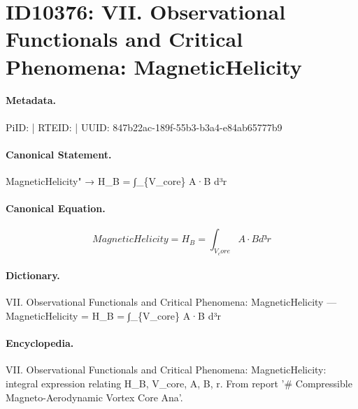 \section*{ID10376: VII. Observational Functionals and Critical Phenomena: MagneticHelicity}
\paragraph{Metadata.}
PiID:  | RTEID:  | UUID: 847b22ac-189f-55b3-b3a4-e84ab65777b9

\paragraph{Canonical Statement.}
MagneticHelicity" → H\_B = ∫\_\{V\_core\} A·B d³r

\paragraph{Canonical Equation.}
\[
MagneticHelicity = H_B = ∫_{V_core} A·B d³r
\]

\paragraph{Dictionary.}
VII. Observational Functionals and Critical Phenomena: MagneticHelicity — MagneticHelicity = H\_B = ∫\_\{V\_core\} A·B d³r

\paragraph{Encyclopedia.}
VII. Observational Functionals and Critical Phenomena: MagneticHelicity: integral expression relating H\_B, V\_core, A, B, r. From report '\# Compressible Magneto-Aerodynamic Vortex Core Ana'.
